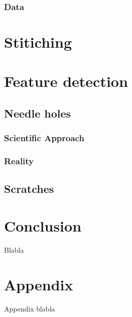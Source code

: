 \documentclass[a4paper,twoside,11pt,openright,table,draft]{article} %
\begin{document}
\subsubsection{Data}
\lipsum[9]
\cleardoublepage

\clearpage
\section{Stitiching}
\label{sec:third_section}

\clearpage
\section{Feature detection}
\label{sec:four_section}

\subsection{Needle holes}
\subsubsection{Scientific Approach}
\subsubsection{Reality}


\subsection{Scratches}


\clearpage
\section{Conclusion}
Blabla

\printbibliography[heading=bibintoc] %
\cleardoublepage

\appendix
\section{Appendix}
Appendix blabla

\pagestyle{empty}

\end{document}
